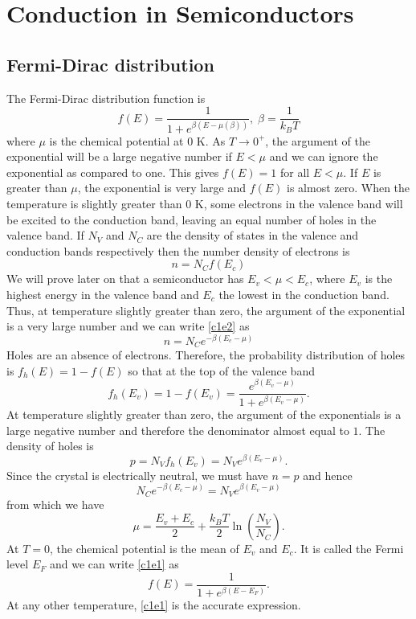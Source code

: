 \chapter{Conduction in Semiconductors}\label{c1}
\section{Fermi-Dirac distribution}\label{c1s1}
The Fermi-Dirac distribution function is
\begin{equation}\label{c1e1}
f(E) = \frac{1}{1 + e^{\beta(E-\mu(\beta))}},\; \beta = \frac{1}{k_BT}
\end{equation}
where $\mu$ is the chemical potential at $0$ K. As $T \rightarrow 0^+$, the 
argument of the exponential will be a large negative number if $E < \mu$ and we 
can ignore the exponential as compared to one. This gives $f(E) = 1$ for all 
$E < \mu$. If $E$ is greater than $\mu$, the exponential is very large and 
$f(E)$ is almost zero. When the temperature is slightly greater than $0$ K, some
electrons in the valence band will be excited to the conduction band, leaving 
an equal number of holes in the valence band. If $N_V$ and $N_C$ are the density 
of states in the valence and conduction bands respectively then the number 
density of electrons is
\begin{equation}\label{c1e2}
n = N_C f(E_c)
\end{equation}
We will prove later on that a semiconductor has $E_v < \mu < E_c$, where $E_v$
is the highest energy in the valence band and $E_c$ the lowest in the conduction
band. Thus, at temperature slightly greater than zero, the argument of the 
exponential is a very large number and we can write \eqref{c1e2} as
\begin{equation}\label{c1e3}
n = N_C e^{-\beta(E_c - \mu)}
\end{equation}
Holes are an absence of electrons. Therefore, the probability distribution of
holes is $f_h(E) = 1 - f(E)$ so that at the top of the valence band
\begin{equation}\label{c1e4}
f_h(E_v) = 1 - f(E_v) = \frac{e^{\beta(E_v - \mu)}}{1 + e^{\beta(E_v - \mu)}}.
\end{equation}
At temperature slightly greater than zero, the argument of the exponentials is
a large negative number and therefore the denominator almost equal to $1$. The
density of holes is
\begin{equation}\label{c1e5}
p = N_Vf_h(E_v) = N_V e^{\beta(E_v - \mu)}.
\end{equation}
Since the crystal is electrically neutral, we must have $n = p$ and hence
\[
N_Ce^{-\beta(E_c - \mu)}  = N_V e^{\beta(E_v - \mu)}
\]
from which we have
\begin{equation}\label{c1e6}
\mu = \frac{E_v + E_c}{2} + \frac{k_BT}{2}\ln\left(\frac{N_V}{N_C}\right).
\end{equation}
At $T = 0$, the chemical potential is the mean of $E_v$ and $E_c$. It is called
the Fermi level $E_F$ and we can
write \eqref{c1e1} as
\begin{equation}\label{c1e7}
f(E) = \frac{1}{1 + e^{\beta(E - E_F)}}.
\end{equation}
At any other temperature, \eqref{c1e1} is the accurate expression.


